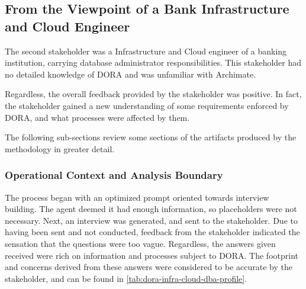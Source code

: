 \subsection{From the Viewpoint of a Bank Infrastructure and Cloud Engineer}

The second stakeholder was a Infrastructure and Cloud engineer of a banking institution, carrying database administrator responsibilities. This stakeholder had no detailed knowledge of \ac{DORA} and was unfamiliar with Archimate.

Regardless, the overall feedback provided by the stakeholder was positive. In fact, the stakeholder gained a new understanding of some requirements enforced by \ac{DORA}, and what processes were affected by them.

The following sub-sections review some sections of the artifacts produced by the methodology in greater detail. 

\subsubsection{Operational Context and Analysis Boundary}

The process began with an optimized prompt oriented towards interview building. The agent deemed it had enough information, so placeholders were not necessary.
Next, an interview was generated, and sent to the stakeholder. Due to having been sent and not conducted, feedback from the stakeholder indicated the sensation that the questions were too vague. Regardless, the answers given received were rich on information and processes subject to \ac{DORA}. The footprint and concerns derived from these answers were considered to be accurate by the stakeholder, and can be found in \ref{tab:dora-infra-cloud-dba-profile}.

